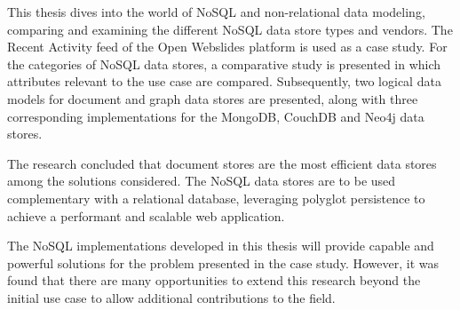 This thesis dives into the world of NoSQL and non-relational data modeling, comparing and examining the different NoSQL data store types and vendors.
The Recent Activity feed of the Open Webslides platform is used as a case study.
For the  categories of NoSQL data stores, a comparative study is presented in which attributes relevant to the use case are compared.
Subsequently, two logical data models for document and graph data stores are presented, along with three corresponding implementations for the MongoDB, CouchDB and Neo4j data stores.

The research concluded that document stores are the most efficient data stores among the solutions considered.
The NoSQL data stores are to be used complementary with a relational database, leveraging polyglot persistence to achieve a performant and scalable web application.

The NoSQL implementations developed in this thesis will provide capable and powerful solutions for the problem presented in the case study.
However, it was found that there are many opportunities to extend this research beyond the initial use case to allow additional contributions to the field.
